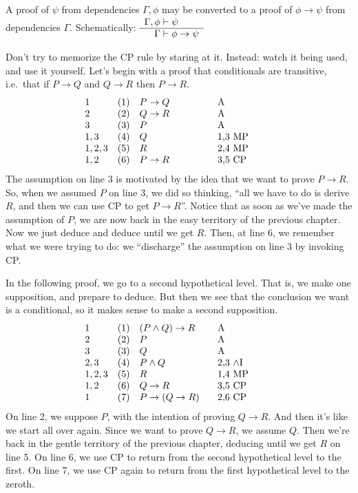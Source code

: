 \bigskip 
\begin{tcolorbox}[enhanced,width=10cm,title=conditional proof (CP),attach boxed title to top
  left={yshift=-2mm,xshift=4mm},boxed title style={sharp corners}] 
A proof of $\psi$ from dependencies $\Gamma ,\phi$ may be converted to a
proof of $\phi\to \psi$ from dependencies $\Gamma$.  \newline Schematically: 
  $\begin{array}{r@{\;}c@{\;}l}
       \Gamma ,\phi & \vdash & \psi \\ \hline
       \Gamma & \vdash & \phi\to \psi \end{array}$
\end{tcolorbox} \bigskip

Don't try to memorize the CP rule by staring at it.  Instead: watch it
being used, and use it yourself.  Let's begin with a proof that
conditionals are transitive, i.e.\ that if $P\to Q$ and $Q\to R$ then
$P\to R$.
\[ \begin{array}{l l >{$}p{2.5cm}<{$} p{2cm}}
  1 & (1) & P\to Q & A \\
  2 & (2) & Q\to R & A \\
  3 & (3) & P & A \\
  1,3 & (4) & Q & 1,3 MP \\
  1,2,3 & (5) & R & 2,4 MP \\
  1,2 & (6) & P\to R & 3,5 CP \end{array} \]
The assumption on line 3 is motivated by the idea that we want to
prove $P\to R$.  So, when we assumed $P$ on line 3, we did so
thinking, ``all we have to do is derive $R$, and then we can use CP to
get $P\to R$''.  Notice that as soon as we've made the assumption of
$P$, we are now back in the easy territory of the previous chapter.
Now we just deduce and deduce until we get $R$.  Then, at line 6, we
remember what we were trying to do: we ``discharge'' the assumption on
line 3 by invoking CP.

In the following proof, we go to a second hypothetical level.  That
is, we make one supposition, and prepare to deduce.  But then we see
that the conclusion we want is a conditional, so it makes sense to
make a second supposition.  
\[ \begin{array}{l l >{$}p{2.5cm}<{$} p{2cm}}
  1 & (1) & (P\wedge Q)\to R & A \\
  2 & (2) & P & A \\
  3 & (3) & Q & A \\
  2,3 & (4) & P\wedge Q & 2,3 $\wedge$I \\
  1,2,3 & (5) & R & 1,4 MP \\
  1,2 & (6) & Q\to R & 3,5 CP \\
     1   & (7) & P\to (Q\to R) & 2,6 CP \end{array} \]
On line 2, we suppose $P$, with the intention of proving $Q\to R$.
And then it's like we start all over again.  Since we want to prove
$Q\to R$, we assume $Q$.  Then we're back in the gentle territory of
the previous chapter, deducing until we get $R$ on line 5.  On line 6,
we use CP to return from the second hypothetical level to the first.
On line 7, we use CP again to return from the first hypothetical level
to the zeroth.

